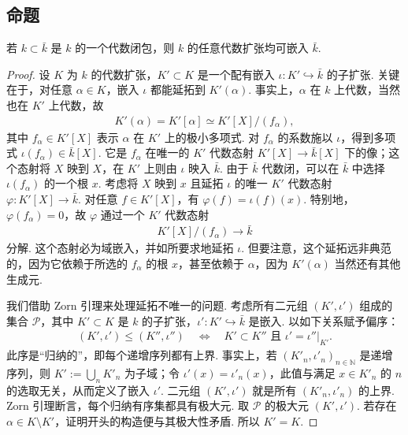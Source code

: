 \subsection{命题}\label{sec:galois-2-2-3}
\begin{proposition*}
若 $k\subset\bar k$ 是 $k$ 的一个代数闭包，则 $k$ 的任意代数扩张均可嵌入 $\bar k$.
\end{proposition*}
\begin{proof}
设 $K$ 为 $k$ 的代数扩张，$K'\subset K$ 是一个配有嵌入 $\iota:K'\hookrightarrow\bar k$ 的子扩张. 关键在于，对任意 $\alpha\in K$，嵌入 $\iota$ 都能延拓到 $K'(\alpha)$. 事实上，$\alpha$ 在 $k$ 上代数，当然也在 $K'$ 上代数，故
\begin{align*}
K'(\alpha)=K'[\alpha]\simeq K'[X]/(f_\alpha),
\end{align*}
其中 $f_\alpha\in K'[X]$ 表示 $\alpha$ 在 $K'$ 上的极小多项式. 对 $f_\alpha$ 的系数施以 $\iota$，得到多项式 $\iota(f_\alpha)\in\bar k[X]$. 它是 $f_\alpha$ 在唯一的 $K'$ 代数态射 $K'[X]\to\bar k[X]$ 下的像；这个态射将 $X$ 映到 $X$，在 $K'$ 上则由 $\iota$ 映入 $\bar k$. 由于 $\bar k$ 代数闭，可以在 $\bar k$ 中选择 $\iota(f_\alpha)$ 的一个根 $x$. 考虑将 $X$ 映到 $x$ 且延拓 $\iota$ 的唯一 $K'$ 代数态射 $\varphi:K'[X]\to\bar k$. 对任意 $f\in K'[X]$，有 $\varphi(f)=\iota(f)(x)$. 特别地，$\varphi(f_\alpha)=0$，故 $\varphi$ 通过一个 $K'$ 代数态射
\begin{align*}
K'[X]/(f_\alpha)\longrightarrow\bar k
\end{align*}
分解. 这个态射必为域嵌入，并如所要求地延拓 $\iota$. 但要注意，这个延拓远非典范的，因为它依赖于所选的 $f_\alpha$ 的根 $x$，甚至依赖于 $\alpha$，因为 $K'(\alpha)$ 当然还有其他生成元.

我们借助 Zorn 引理来处理延拓不唯一的问题. 考虑所有二元组 $(K',\iota')$ 组成的集合 $\mathcal P$，其中 $K'\subset K$ 是 $k$ 的子扩张，$\iota':K'\hookrightarrow\bar k$ 是嵌入. 以如下关系赋予偏序：
\begin{align*}
(K',\iota')\le(K'',\iota'')\quad\Longleftrightarrow\quad K'\subset K''\text{ 且 }\iota'=\iota''|_{K'}.
\end{align*}
此序是``归纳的''，即每个递增序列都有上界. 事实上，若 $(K'_n,\iota'_n)_{n\in\mathbb N}$ 是递增序列，则 $K':=\bigcup_nK'_n$ 为子域；令 $\iota'(x)=\iota'_n(x)$，此值与满足 $x\in K'_n$ 的 $n$ 的选取无关，从而定义了嵌入 $\iota'$. 二元组 $(K',\iota')$ 就是所有 $(K'_n,\iota'_n)$ 的上界. Zorn 引理断言，每个归纳有序集都具有极大元. 取 $\mathcal P$ 的极大元 $(K',\iota')$. 若存在 $\alpha\in K\setminus K'$，证明开头的构造便与其极大性矛盾. 所以 $K'=K$.
\end{proof}

